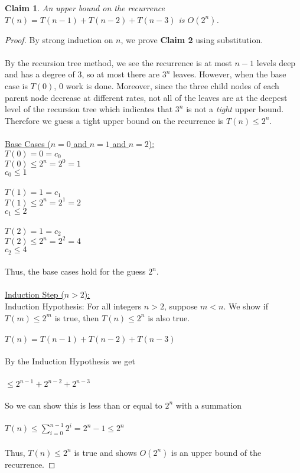 \documentclass[11pt]{article}
\newtheorem{claim}[theorem]{Claim}
\theoremstyle{nonumberplain}
\newtheorem{proof}{Proof}
\begin{document}
\begin{claim}
An upper bound on the recurrence $T(n)=T(n-1)+T(n-2)+T(n-3)$ is $O(2^n)$.
\end{claim}
\begin{proof}
By strong induction on $n$, we prove \textbf{Claim 2} using substitution. \\
\\
By the recursion tree method, we see the recurrence is at most $n-1$ levels deep and has a degree of 3, so at most there are $3^n$ leaves. However, when the base case is $T(0)$, 0 work is done. Moreover, since the three child nodes of each parent node decrease at different rates, not all of the leaves are at the deepest level of the recursion tree which indicates that $3^n$ is not a \emph{tight} upper bound. Therefore we guess a tight upper bound on the recurrence is $T(n) \le 2^n$. \\
\\
\ul{Base Cases ($n=0$ and $n=1$ and $n=2$):} \\
$T(0)=0=c_0$ \\
$T(0) \le 2^n=2^0=1$ \\
\phantom{T1}$c_0 \le 1$ \\
\\
$T(1)=1=c_1$ \\
$T(1) \le 2^n=2^1=2$ \\
\phantom{T1}$c_1 \le 2$ \\
\\
$T(2)=1=c_2$ \\
$T(2) \le 2^n=2^2=4$ \\
\phantom{T1}$c_2 \le 4$ \\
\\
Thus, the base cases hold for the guess $2^n$. \\
\\
\ul{Induction Step ($n>2$):} \\
Induction Hypothesis: For all integers $n>2$, suppose $m<n$. We show if $T(m) \le 2^m$ is true, then $T(n) \le 2^n$ is also true. \\
\\
$T(n)=T(n-1)+T(n-2)+T(n-3)$ \\
\\
By the Induction Hypothesis we get \\
\\
\phantom{T(n) }$\le 2^{n-1}+2^{n-2}+2^{n-3}$ \\
\\
So we can show this is less than or equal to $2^n$ with a summation \\
\\
$T(n) \le \sum\limits_{i=0}^{n-1}2^i=2^n-1 \le 2^n$ \\
\\
Thus, $T(n) \le 2^n$ is true and shows $O(2^n)$ is an upper bound of the recurrence.
\end{proof}
\end{document}
